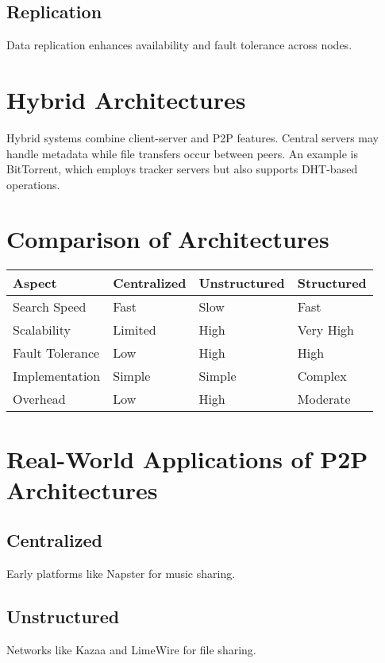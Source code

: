 \documentclass[10pt]{article}
\begin{document}
\subsection{Replication}
Data replication enhances availability and fault tolerance across nodes.

\section{Hybrid Architectures}
Hybrid systems combine client-server and P2P features. Central servers may handle metadata while file transfers occur between peers. An example is BitTorrent, which employs tracker servers but also supports DHT-based operations. 

\section{Comparison of Architectures}
\begin{center}
\begin{tabular}{|l|l|l|l|}
\hline
\textbf{Aspect} & \textbf{Centralized} & \textbf{Unstructured} & \textbf{Structured} \\
\hline
Search Speed & Fast & Slow & Fast \\
Scalability & Limited & High & Very High \\
Fault Tolerance & Low & High & High \\
Implementation & Simple & Simple & Complex \\
Overhead & Low & High & Moderate \\
\hline
\end{tabular}
\end{center}

\section{Real-World Applications of P2P Architectures}
\subsection{Centralized}
Early platforms like Napster for music sharing.

\subsection{Unstructured}
Networks like Kazaa and LimeWire for file sharing.
\end{document}
